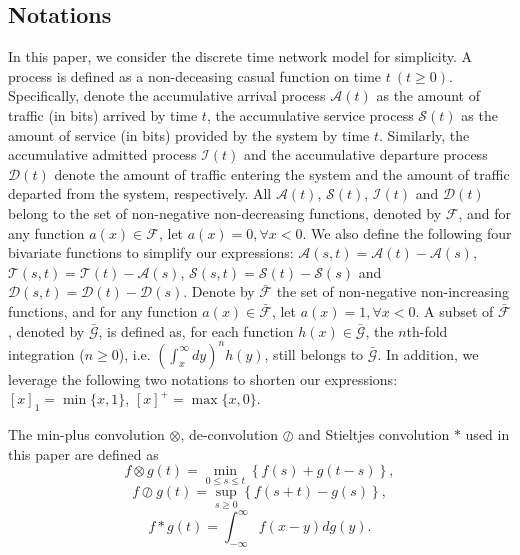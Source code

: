 \documentclass[12pt]{article}
\begin{document}
\subsection{Notations}\label{notation}
In this paper, we consider the discrete time network model for simplicity. A process is defined as a non-deceasing casual function on time $t\ (t\geq 0)$. Specifically, denote the accumulative arrival process $\mathcal{A}(t)$ as the amount of traffic (in bits) arrived by time $t$, the accumulative service process $\mathcal{S}(t)$ as the amount of service (in bits) provided by the system by time $t$. Similarly, the accumulative admitted process $\mathcal{I}(t)$ and the accumulative departure process $\mathcal{D}(t)$ denote the amount of traffic entering the system and the amount of traffic departed from the system, respectively. All $\mathcal{A}(t)$, $\mathcal{S}(t)$, $\mathcal{I}(t)$ and $\mathcal{D}(t)$ belong to the set of non-negative non-decreasing functions, denoted by $\mathcal{F}$, and for any function $a(x)\in\mathcal{F}$, let $a(x)=0,\forall x<0$. We also define the following four bivariate functions to simplify our expressions: $\mathcal{A}(s,t)=\mathcal{A}(t)-\mathcal{A}(s)$, $\mathcal{T}(s,t)=\mathcal{T}(t)-\mathcal{A}(s)$, $\mathcal{S}(s,t)=\mathcal{S}(t)-\mathcal{S}(s)$ and $\mathcal{D}(s,t)=\mathcal{D}(t)-\mathcal{D}(s)$. Denote by $\bar{\mathcal{F}}$ the set of non-negative non-increasing functions, and for any function $a(x)\in\bar{\mathcal{F}}$, let $a(x)=1,\forall x<0$. A subset of $\bar{\mathcal{F}}$, denoted by $\bar{\mathcal{G}}$, is defined as, for each function $h(x)\in\bar{\mathcal{G}}$, the $n$th-fold integration ($n\geq 0$), i.e. $(\int_{x}^\infty dy)^nh(y)$, still belongs to $\bar{\mathcal{G}}$. In addition, we leverage the following two notations to shorten our expressions: $[x]_1=\min\{x,1\}$, $[x]^+=\max\{x,0\}$.

The min-plus convolution $\otimes$, de-convolution $\oslash$ and Stieltjes convolution $\ast$ used in this paper are defined as
$$f\otimes g(t)=\min_{0\leq s\leq t}\left\{f(s)+g(t-s)\right\},$$
$$f\oslash g(t)=\sup_{s\geq 0}\left\{f(s+t)-g(s)\right\},$$
$$f\ast g(t)=\int_{-\infty}^{\infty}f(x-y)dg(y).$$
\end{document}
